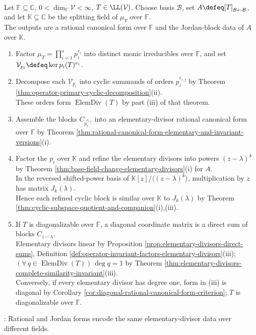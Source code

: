 \begin{computationmethod} \label{meth:operator-module-to-spectral-form} \\
Let $\mathbb{F}\subseteq\mathbb{C}$, $0<\dim_{\mathbb{F}}\mathcal{V}<\infty$, $T\in\LL(\mathcal{V})$. Choose basis $\mathcal{B}$, set $A\defeq[T]_{\mathcal{B}\leftarrow\mathcal{B}}$, and let $\mathbb{K}\subseteq\mathbb{C}$ be the splitting field of $\mu_T$ over $\mathbb{F}$.\\
The outputs are a rational canonical form over $\mathbb{F}$ and the Jordan-block data of $A$ over $\mathbb{K}$.
\begin{enumerate}[label=(\roman*)]
\setlength{\itemsep}{0pt}
\item Factor $\mu_T=\prod\limits_{i=1}^s p_i^{e_i}$ into distinct monic irreducibles over $\mathbb{F}$, and set $\mathcal{V}_{p_i}\defeq\ker p_i(T)^{e_i}$.
\item Decompose each $\mathcal{V}_{p_i}$ into cyclic summands of orders $p_i^{e_{i,j}}$ by Theorem \ref{thm:operator-primary-cyclic-decomposition}(ii).\\
These orders form $\operatorname{ElemDiv}(T)$ by part (iii) of that theorem.
\item Assemble the blocks $C_{p_i^{e_{i,j}}}$ into an elementary-divisor rational canonical form over $\mathbb{F}$ by Theorem \ref{thm:rational-canonical-form-elementary-and-invariant-versions}(i).
\item Factor the $p_i$ over $\mathbb{K}$ and refine the elementary divisors into powers $(z-\lambda)^k$ by Theorem \ref{thm:base-field-change-elementary-divisors}(i) for $A$.\\
In the reversed shifted-power basis of $\mathbb{K}[z]/\langle(z-\lambda)^k\rangle$, multiplication by $z$ has matrix $J_k(\lambda)$.\\
Hence each refined cyclic block is similar over $\mathbb{K}$ to $J_k(\lambda)$ by Theorem \ref{thm:cyclic-subspace-quotient-and-companion}(i),(iii).
\item If $T$ is diagonalizable over $\mathbb{F}$, a diagonal coordinate matrix is a direct sum of blocks $C_{z-\lambda}$.\\
Elementary divisors linear by Proposition \ref{prop:elementary-divisors-direct-sums}, Definition \ref{def:operator-invariant-factors-elementary-divisors}(iii); $(\forall\,q\in\operatorname{ElemDiv}(T))\,\deg q=1$ by Theorem \ref{thm:elementary-divisors-complete-similarity-invariant}(iii).\\
Conversely, if every elementary divisor has degree one, form in (iii) is diagonal by Corollary \ref{cor:diagonal-rational-canonical-form-criterion}; $T$ is diagonalizable over $\mathbb{F}$.
\end{enumerate}
: Rational and Jordan forms encode the same elementary-divisor data over different fields.
\end{computationmethod}

